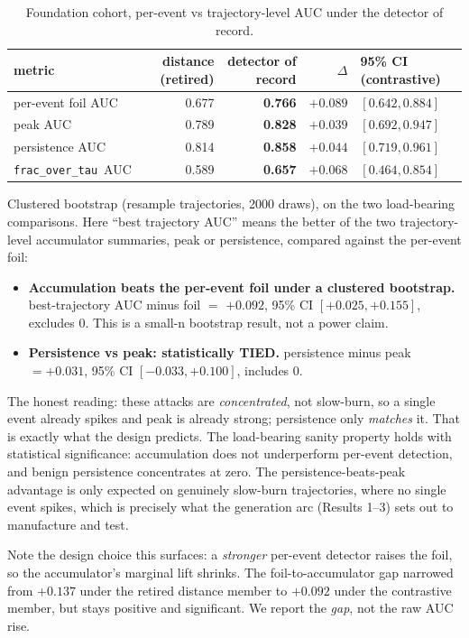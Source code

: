 \documentclass[11pt]{article}
\newcommand{\fracovertau}{\texttt{frac\_over\_tau}}
\begin{document}
\begin{table}[h]\centering
\begin{tabular}{lrrrl}
\toprule
metric & distance (retired) & detector of record & $\Delta$ & 95\% CI (contrastive) \\
\midrule
per-event foil AUC & 0.677 & \textbf{0.766} & $+0.089$ & $[0.642, 0.884]$ \\
peak AUC           & 0.789 & \textbf{0.828} & $+0.039$ & $[0.692, 0.947]$ \\
persistence AUC    & 0.814 & \textbf{0.858} & $+0.044$ & $[0.719, 0.961]$ \\
\fracovertau\ AUC  & 0.589 & \textbf{0.657} & $+0.068$ & $[0.464, 0.854]$ \\
\bottomrule
\end{tabular}
\caption{Foundation cohort, per-event vs trajectory-level AUC under the detector of record.}
\label{tab:result0}
\end{table}

Clustered bootstrap (resample trajectories, 2000 draws), on the two load-bearing comparisons. Here
``best trajectory AUC'' means the better of the two trajectory-level accumulator summaries, peak or
persistence, compared against the per-event foil:

\begin{itemize}
\item \textbf{Accumulation beats the per-event foil under a clustered bootstrap.} best-trajectory AUC minus
  foil $=$ \textbf{$+0.092$}, 95\% CI \textbf{$[+0.025, +0.155]$}, excludes 0. This is a small-n bootstrap result,
  not a power claim.
\item \textbf{Persistence vs peak: statistically TIED.} persistence minus peak $= +0.031$, 95\% CI
  $[-0.033, +0.100]$, includes 0.
\end{itemize}

The honest reading: these attacks are \emph{concentrated}, not slow-burn, so a single event already
spikes and peak is already strong; persistence only \emph{matches} it. That is exactly what the design
predicts. The load-bearing sanity property holds with statistical significance: accumulation does not underperform per-event detection, and benign persistence concentrates at zero. The persistence-beats-peak
advantage is only expected on genuinely slow-burn trajectories, where no single event spikes, which
is precisely what the generation arc (Results 1--3) sets out to manufacture and test.

Note the design choice this surfaces: a \emph{stronger} per-event detector raises the foil, so the
accumulator's marginal lift shrinks. The foil-to-accumulator gap narrowed from $+0.137$ under the
retired distance member to $+0.092$ under the contrastive member, but stays positive and significant.
We report the \emph{gap}, not the raw AUC rise.
\end{document}
